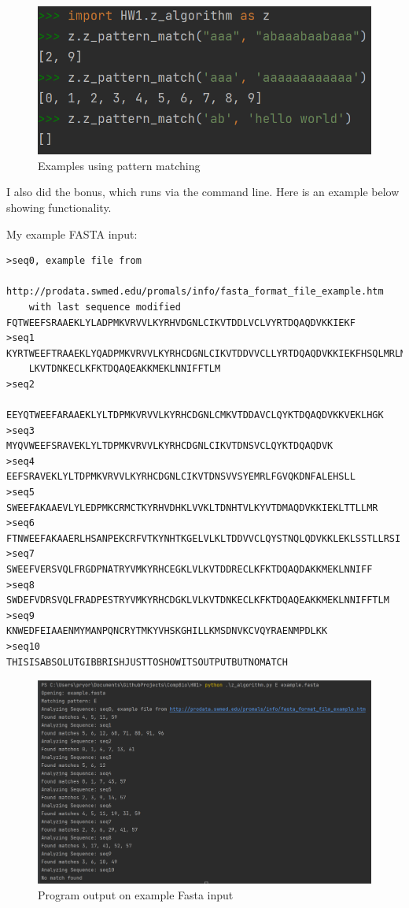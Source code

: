 \documentclass[11pt]{article}
\begin{document}
\begin{figure}[h]
    \centering
    \includegraphics[]{example2.png}
    \caption{Examples using pattern matching}
    \label{fig:z_alg}
\end{figure}

I also did the bonus, which runs via the command line. Here is an example below showing functionality.

My example FASTA input:
\begin{verbatim}
>seq0, example file from 
    http://prodata.swmed.edu/promals/info/fasta_format_file_example.htm 
    with last sequence modified
FQTWEEFSRAAEKLYLADPMKVRVVLKYRHVDGNLCIKVTDDLVCLVYRTDQAQDVKKIEKF
>seq1
KYRTWEEFTRAAEKLYQADPMKVRVVLKYRHCDGNLCIKVTDDVVCLLYRTDQAQDVKKIEKFHSQLMRLME 
    LKVTDNKECLKFKTDQAQEAKKMEKLNNIFFTLM
>seq2
    EEYQTWEEFARAAEKLYLTDPMKVRVVLKYRHCDGNLCMKVTDDAVCLQYKTDQAQDVKKVEKLHGK
>seq3
MYQVWEEFSRAVEKLYLTDPMKVRVVLKYRHCDGNLCIKVTDNSVCLQYKTDQAQDVK
>seq4
EEFSRAVEKLYLTDPMKVRVVLKYRHCDGNLCIKVTDNSVVSYEMRLFGVQKDNFALEHSLL
>seq5
SWEEFAKAAEVLYLEDPMKCRMCTKYRHVDHKLVVKLTDNHTVLKYVTDMAQDVKKIEKLTTLLMR
>seq6
FTNWEEFAKAAERLHSANPEKCRFVTKYNHTKGELVLKLTDDVVCLQYSTNQLQDVKKLEKLSSTLLRSI
>seq7
SWEEFVERSVQLFRGDPNATRYVMKYRHCEGKLVLKVTDDRECLKFKTDQAQDAKKMEKLNNIFF
>seq8
SWDEFVDRSVQLFRADPESTRYVMKYRHCDGKLVLKVTDNKECLKFKTDQAQEAKKMEKLNNIFFTLM
>seq9
KNWEDFEIAAENMYMANPQNCRYTMKYVHSKGHILLKMSDNVKCVQYRAENMPDLKK
>seq10
THISISABSOLUTGIBBRISHJUSTTOSHOWITSOUTPUTBUTNOMATCH      
\end{verbatim}


\begin{figure}[h]
    \centering
    \includegraphics[width = \textwidth]{fasta.png}
    \caption{Program output on example Fasta input}
    
\end{figure}
\end{document}
